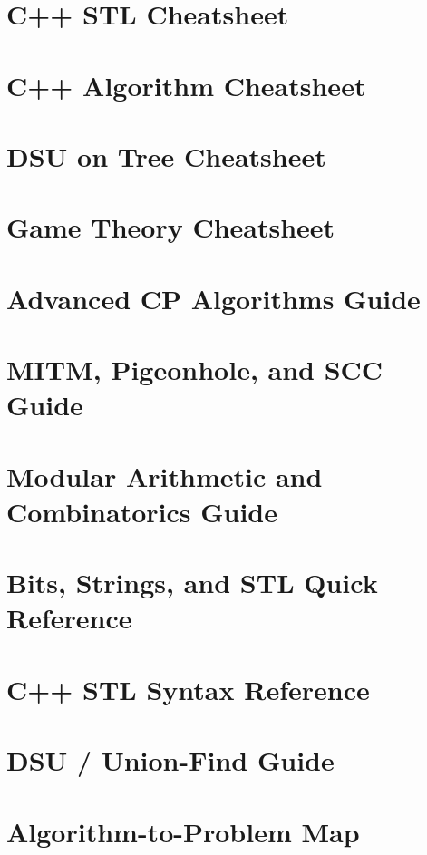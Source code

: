 \appendix
\chapter{C++ STL Cheatsheet}



\chapter{C++ Algorithm Cheatsheet}



\chapter{DSU on Tree Cheatsheet}



\chapter{Game Theory Cheatsheet}



\chapter{Advanced CP Algorithms Guide}



\chapter{MITM, Pigeonhole, and SCC Guide}



\chapter{Modular Arithmetic and Combinatorics Guide}


\chapter{Bits, Strings, and STL Quick Reference}


\chapter{C++ STL Syntax Reference}


\chapter{DSU / Union-Find Guide}


\chapter{Algorithm-to-Problem Map}

